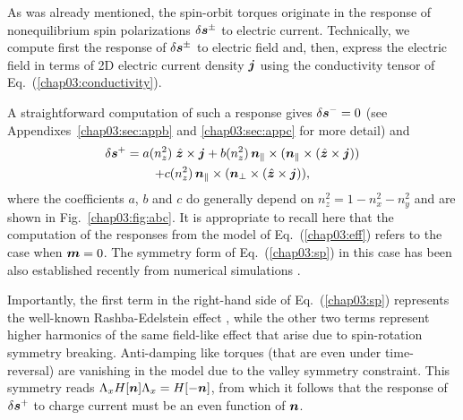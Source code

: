 As was already mentioned, the spin-orbit torques originate in the response of nonequilibrium spin polarizations $\delta\boldsymbol{s}^\pm$ to electric current. Technically, we compute first the response of $\delta\boldsymbol{s}^\pm$ to electric field and, then, express the electric field in terms of 2D electric current density $\boldsymbol{j}$ using the conductivity tensor of Eq.~(\ref{chap03:conductivity}).

A straightforward computation of such a response gives $\delta\boldsymbol{s}^-=0$ (see Appendixes~\ref{chap03:sec:appb} and \ref{chap03:sec:appc} for more detail) and 
\begin{multline}
\label{chap03:sp}
\delta\boldsymbol{s}^+= a(n_z^2)\;\hat{\boldsymbol{z}}\times \boldsymbol{j} + b(n_z^2)\, \boldsymbol{n}_\parallel\times(\boldsymbol{n}_\parallel\times \left(\hat{\boldsymbol{z}}\times \boldsymbol{j}\right))\\
+ c(n_z^2)\, \boldsymbol{n}_\parallel \times(\boldsymbol{n}_\perp\times \left(\hat{\boldsymbol{z}}\times \boldsymbol{j}\right)),
\end{multline}
where the coefficients $a$, $b$ and $c$ do generally depend on $n_z^2=1-n_x^2-n_y^2$ and are shown in Fig.~\ref{chap03:fig:abc}. 
It is appropriate to recall here that the computation of the responses from the model of Eq.~(\ref{chap03:eff}) refers to the case when $\boldsymbol{m}=0$. The symmetry form of Eq.~(\ref{chap03:sp}) in this case has been also established recently from numerical simulations \cite{sumit2019}.

Importantly, the first term in the right-hand side of Eq.~(\ref{chap03:sp}) represents the well-known Rashba-Edelstein effect \cite{edelstein_spin_1990}, while the other two terms represent higher harmonics of the same field-like effect that arise due to spin-rotation symmetry breaking. Anti-damping like torques (that are even under time-reversal) are vanishing in the model due to the valley symmetry constraint. This symmetry reads $\Lambda_x H[\boldsymbol{n}] \Lambda_x = H[-\boldsymbol{n}]$, from which it follows that the response of $\delta\boldsymbol{s}^+$ to charge current must be an even function of $\boldsymbol{n}$. 

